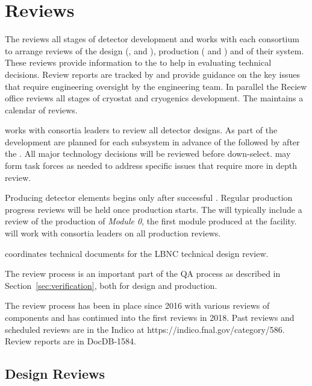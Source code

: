 \chapter{Reviews}
\label{vl:tc-review}

The    reviews all stages of
detector development and works with each consortium to arrange reviews
of the design (,  and ), production
( and ) and  of their system. These
reviews provide information to the  to help in evaluating
technical decisions.  Review reports are tracked by  and
provide guidance on the key issues that require engineering oversight
by the  engineering team. In parallel the Reciew office
reviews all stages of  cryostat and cryogenics
development. The   maintains a calendar of 
reviews.

 works with consortia leaders to review all detector
designs.  As part of the  development  are
planned for each subsystem in advance of the  followed by
 after the .  All major technology decisions
will be reviewed before down-select.   may form task forces
as needed to address specific issues that require more in depth
review.


Producing detector elements begins only after
successful . Regular production progress
reviews will be held once production starts. The 
will typically include a review of the production of \textit{Module 0}, the
first module produced at the facility.  will work with
consortia leaders on all production reviews.

 coordinates technical documents for the LBNC
technical design review.

The review process is an important part of the  QA process
as described in Section~\ref{sec:verification}, both for
design and production.

The review process has been in place since 2016 with various reviews
of  components and has continued into the first 
reviews in 2018. Past reviews and scheduled reviews are in the
 Indico at https://indico.fnal.gov/category/586.
Review reports are in DocDB-1584\cite{bib:docdb1584}.

\section{Design Reviews}

